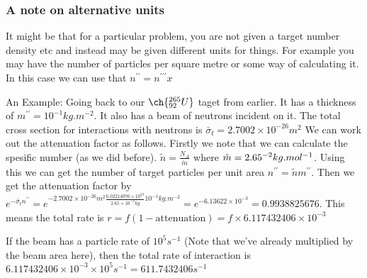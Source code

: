 \subsubsection{A note on alternative units}
It might be that for a particular problem, you are not given a target number density etc and instead may be given different units for things. For example you may have the number of particles per square metre or some way of calculating it. In this case we can use that $n^{\prime\prime}=n^{\prime\prime\prime}x$

\begin{framed}
An Example: Going back to our $\ch{^{265}_{92}U}$ taget from earlier. It has a thickness of $m^{\prime\prime}=10^{-1}kg.m^{-2}$. It also has a beam of neutrons incident on it. The total cross section for interactions with neutrons is $\bar{\sigma}_t=2.7002\times10^{-26}m^2$ We can work out the attenuation factor as follows. Firstly we note that we can calculate the spesific number (as we did before). $\tilde{n}=\frac{N_A}{\check{m}}$ where $\check{m}=2.65\time10^{-2}kg.mol^{-1}$. Using this we can get the number of target particles per unit area $n^{\prime\prime}=\tilde{n}m^{\prime\prime}$.
Then we get the attenuation factor by $e^{-\bar{\sigma}_t n^{\prime\prime}}=e^{-2.7002\times10^{-26}m^2 \frac{6.02214076\times10^{23}}{2.65\times10^{-2}kg}10^{-1}kg.m^{-2}}=e^{-6.13622\times10^{-3}}=0.9938825676$. This means the total rate is $r=f(1-\mathrm{attenuation})=f\times6.117432406\times10^{-3}$

If the beam has a particle rate of $10^5s^{-1}$ (Note that we've already multiplied by the beam area here), then the total rate of interaction is
$6.117432406\times10^{-3}\times10^{5}s^{-1}=611.7432406s^{-1}$
\end{framed}
